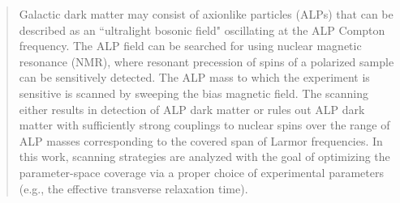 \documentclass{WileyMSP-template}
\begin{document}




\begin{abstract}
Galactic dark matter may consist of axionlike particles (ALPs) that can be described as an ``ultralight bosonic field" oscillating at the ALP Compton frequency. The ALP field can be searched for using nuclear magnetic resonance (NMR), where resonant precession of spins of a polarized sample can be sensitively detected.
The ALP mass to which the experiment is sensitive is scanned by sweeping the bias magnetic field.
The scanning either results in detection of ALP dark matter or 
rules out ALP dark matter with sufficiently strong couplings to nuclear spins over the range of ALP masses corresponding to the covered span of Larmor frequencies. In this work, scanning strategies are analyzed with the goal of optimizing the parameter-space coverage via a proper choice of experimental parameters (e.g., the effective transverse relaxation time).

\end{abstract}





% 

% 

% 

% 

% 

\end{document}

